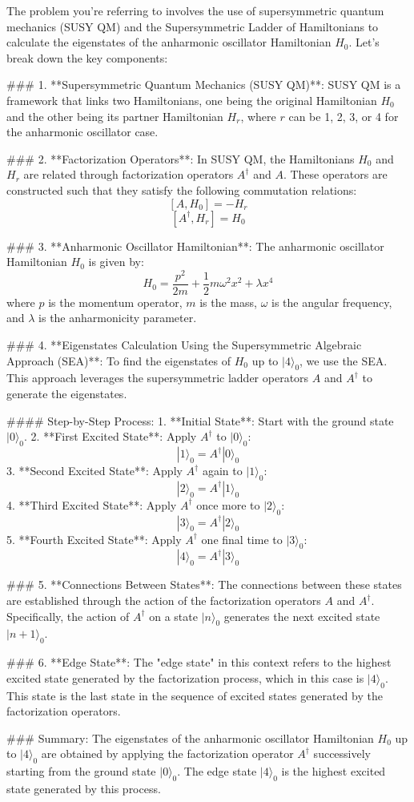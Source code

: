 The problem you're referring to involves the use of supersymmetric quantum mechanics (SUSY QM) and the Supersymmetric Ladder of Hamiltonians to calculate the eigenstates of the anharmonic oscillator Hamiltonian \( H_0 \). Let's break down the key components:

### 1. **Supersymmetric Quantum Mechanics (SUSY QM)**:
SUSY QM is a framework that links two Hamiltonians, one being the original Hamiltonian \( H_0 \) and the other being its partner Hamiltonian \( H_r \), where \( r \) can be 1, 2, 3, or 4 for the anharmonic oscillator case.

### 2. **Factorization Operators**:
In SUSY QM, the Hamiltonians \( H_0 \) and \( H_r \) are related through factorization operators \( A^\dagger \) and \( A \). These operators are constructed such that they satisfy the following commutation relations:
\[ [A, H_0] = -H_r \]
\[ [A^\dagger, H_r] = H_0 \]

### 3. **Anharmonic Oscillator Hamiltonian**:
The anharmonic oscillator Hamiltonian \( H_0 \) is given by:
\[ H_0 = \frac{p^2}{2m} + \frac{1}{2}m\omega^2 x^2 + \lambda x^4 \]
where \( p \) is the momentum operator, \( m \) is the mass, \( \omega \) is the angular frequency, and \( \lambda \) is the anharmonicity parameter.

### 4. **Eigenstates Calculation Using the Supersymmetric Algebraic Approach (SEA)**:
To find the eigenstates of \( H_0 \) up to \( |4\rangle_0 \), we use the SEA. This approach leverages the supersymmetric ladder operators \( A \) and \( A^\dagger \) to generate the eigenstates.

#### Step-by-Step Process:
1. **Initial State**: Start with the ground state \( |0\rangle_0 \).
2. **First Excited State**: Apply \( A^\dagger \) to \( |0\rangle_0 \):
   \[ |1\rangle_0 = A^\dagger |0\rangle_0 \]
3. **Second Excited State**: Apply \( A^\dagger \) again to \( |1\rangle_0 \):
   \[ |2\rangle_0 = A^\dagger |1\rangle_0 \]
4. **Third Excited State**: Apply \( A^\dagger \) once more to \( |2\rangle_0 \):
   \[ |3\rangle_0 = A^\dagger |2\rangle_0 \]
5. **Fourth Excited State**: Apply \( A^\dagger \) one final time to \( |3\rangle_0 \):
   \[ |4\rangle_0 = A^\dagger |3\rangle_0 \]

### 5. **Connections Between States**:
The connections between these states are established through the action of the factorization operators \( A \) and \( A^\dagger \). Specifically, the action of \( A^\dagger \) on a state \( |n\rangle_0 \) generates the next excited state \( |n+1\rangle_0 \).

### 6. **Edge State**:
The "edge state" in this context refers to the highest excited state generated by the factorization process, which in this case is \( |4\rangle_0 \). This state is the last state in the sequence of excited states generated by the factorization operators.

### Summary:
The eigenstates of the anharmonic oscillator Hamiltonian \( H_0 \) up to \( |4\rangle_0 \) are obtained by applying the factorization operator \( A^\dagger \) successively starting from the ground state \( |0\rangle_0 \). The edge state \( |4\rangle_0 \) is the highest excited state generated by this process.